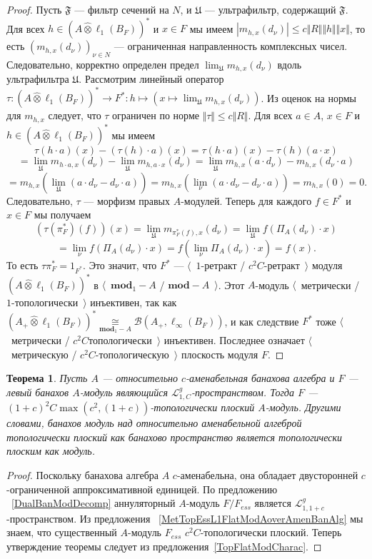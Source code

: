 \documentclass[12pt]{article}
\newtheorem{theorem}{Теорема}[section]
\newcommand{\projtens}{\mathbin{\widehat{\otimes}}}
\newcommand{\isom}[1]{\mathop{\mathbin{\cong}}\limits_{#1}}
\begin{document}
\begin{proof}
Пусть $\mathfrak{F}$ --- фильтр сечений на $N$, и $\mathfrak{U}$ ---
ультрафильтр, содержащий $\mathfrak{F}$. Для всех $h\in
{(A\projtens\ell_1(B_F))}^*$ и $x\in F$ мы имеем $|m_{h,x}(d_\nu)|\leq c\Vert
R\Vert\Vert h\Vert\Vert x\Vert$, то есть ${(m_{h,x}(d_\nu))}_{\nu\in N}$ ---
ограниченная направленность комплексных чисел. Следовательно, корректно
определен предел $\lim_{\mathfrak{U}}m_{h,x}(d_\nu)$ вдоль ультрафильтра
$\mathfrak{U}$. Рассмотрим линейный оператор
$\tau:{(A\projtens\ell_1(B_F))}^*\to
F^*:h\mapsto(x\mapsto\lim_{\mathfrak{U}}m_{h,x}(d_\nu))$. Из оценок на нормы для
$m_{h,x}$ следует, что $\tau$ ограничен по норме $\Vert\tau\Vert\leq c\Vert
R\Vert$. Для всех $a\in A$, $x\in F$ и $h\in {(A\projtens\ell_1(B_F))}^*$ мы
имеем
\[
\tau(h\cdot a)(x)-(\tau(h)\cdot a)(x)
=\tau(h\cdot a)(x)-\tau(h)(a\cdot x)
\]
\[
=\lim_{\mathfrak{U}}m_{h\cdot a,x}(d_\nu)-\lim_{\mathfrak{U}}m_{h,a\cdot x}(d_\nu)
=\lim_{\mathfrak{U}}m_{h,x}(a\cdot d_\nu)-m_{h,x}(d_\nu\cdot a)
\]
\[
=m_{h,x}\left(\lim_{\mathfrak{U}}(a\cdot d_\nu-d_\nu\cdot a)\right)
=m_{h,x}\left(\lim_{\nu}(a\cdot d_\nu-d_\nu\cdot a)\right)
=m_{h,x}(0)
=0.
\]
Следовательно, $\tau$ --- морфизм правых $A$-модулей. Теперь для каждого $f\in
F^*$ и $x\in F$ мы получаем
\[
(\tau(\pi_F^*)(f))(x)
=\lim_{\mathfrak{U}}m_{\pi_F^*(f),x}(d_\nu)
=\lim_{\mathfrak{U}}f(\Pi_A(d_\nu)\cdot x)
\]
\[
=\lim_{\nu}f(\Pi_A(d_\nu)\cdot x)
=f\left(\lim_{\nu}\Pi_A(d_\nu)\cdot x\right)
=f(x).
\]
То есть $\tau\pi_F^*=1_{F^*}$. Это значит, что $F^*$ --- $\langle$~$1$-ретракт /
 $c^2 C$-ретракт~$\rangle$ модуля ${(A\projtens\ell_1(B_F))}^*$ в
 $\langle$~$\mathbf{mod}_1-A$ / $\mathbf{mod}-A$~$\rangle$. Этот $A$-модуль
 $\langle$~метрически / $1$-топологически~$\rangle$ инъективен, так как
 ${(A_+\projtens\ell_1(B_F))}^*
 \isom{\mathbf{mod}_1-A}\mathcal{B}(A_+,\ell_\infty(B_F))$, и как следствие
 $F^*$ тоже $\langle$~метрически / $c^2C$топологически~$\rangle$ инъективен.
 Последнее означает $\langle$~метрическую / $c^2 C$-топологическую~$\rangle$
 плоскость модуля $F$.
\end{proof}

\begin{theorem}\label{TopL1FlatModAoverAmenBanAlg} Пусть $A$ --- относительно
$c$-аменабельная банахова алгебра и $F$ --- левый банахов $A$-модуль являющийся
$\mathcal{L}_{1, C}^g$-пространством. Тогда $F$ ---
${(1+c)}^2C\max(c^2,(1+c))$-топологически плоский $A$-модуль. Другими словами,
банахов модуль над относительно аменабельной алгеброй топологически плоский как
банахово пространство является топологически плоским как модуль.
\end{theorem}
\begin{proof} Поскольку банахова алгебра $A$ $c$-аменабельна, она обладает
двусторонней $c$-ограниченной аппроксимативной единицей. По предложению
~\ref{DualBanModDecomp} аннуляторный $A$-модуль $F/F_{ess}$ является
$\mathcal{L}_{1,1+c}^g$-пространством. Из предложения
~\ref{MetTopEssL1FlatModAoverAmenBanAlg} мы знаем, что существенный $A$-модуль
$F_{ess}$ $c^2 C$-топологически плоский. Теперь утверждение теоремы следует из
предложения~\ref{TopFlatModCharac}.
\end{proof}
\end{document}
